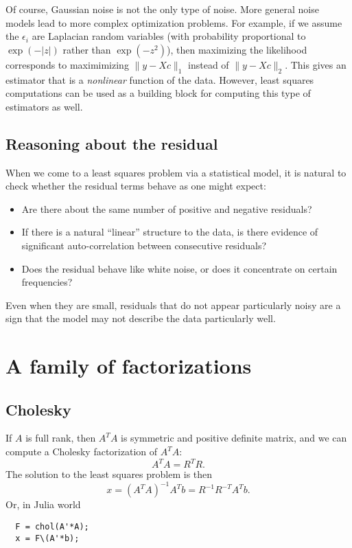 \documentclass[12pt, leqno]{article} %
\begin{document}
Of course, Gaussian noise is not the only type of noise.  More general
noise models lead to more complex optimization problems.  For example,
if we assume the $\epsilon_i$ are Laplacian random variables (with
probability proportional to $\exp(-|z|)$ rather than $\exp(-z^2)$),
then maximizing the likelihood corresponds to maximimizing
$\|y-Xc\|_1$ instead of $\|y-Xc\|_2$.  This gives an estimator that is
a {\em nonlinear} function of the data.  However, least squares
computations can be used as a building block for computing this type
of estimators as well.

\subsection{Reasoning about the residual}

When we come to a least squares problem via a statistical model, it is
natural to check whether the residual terms behave as one might
expect:
\begin{itemize}
\item Are there about the same number of positive and negative
  residuals?
\item If there is a natural ``linear'' structure to the data, is there
  evidence of significant auto-correlation between consecutive
  residuals?
\item Does the residual behave like white noise, or does it
  concentrate on certain frequencies?
\end{itemize}
Even when they are small, residuals that do not appear particularly
noisy are a sign that the model may not describe the data particularly
well.

\section{A family of factorizations}

\subsection{Cholesky}

If $A$ is full rank, then $A^T A$ is symmetric and positive definite
matrix, and we can compute a Cholesky factorization of $A^T A$:
\[
  A^T A = R^T R.
\]
The solution to the least squares problem is then
\[
  x = (A^T A)^{-1} A^T b = R^{-1} R^{-T} A^T b.
\]
Or, in Julia world
\begin{lstlisting}
  F = chol(A'*A);
  x = F\(A'*b);
\end{lstlisting}
\end{document}
